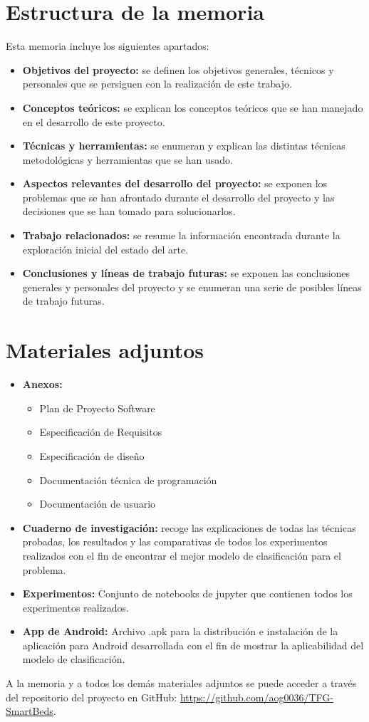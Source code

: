 \section{Estructura de la memoria}

Esta memoria incluye los siguientes apartados: 

\begin{itemize}
	\item \textbf{Objetivos del proyecto:} se definen los objetivos generales, técnicos y personales que se persiguen con la realización de este trabajo. 
	\item \textbf{Conceptos teóricos:} se explican los conceptos teóricos que se han manejado en el desarrollo de este proyecto. 
	\item \textbf{Técnicas y herramientas:} se enumeran y explican las distintas técnicas metodológicas y herramientas que se han usado. 
	\item \textbf{Aspectos relevantes del desarrollo del proyecto:} se exponen los problemas que se han afrontado durante el desarrollo del proyecto y las decisiones que se han tomado para solucionarlos. 
	\item \textbf{Trabajo relacionados:} se resume la información encontrada durante la exploración inicial del estado del arte. 
	\item \textbf{Conclusiones y líneas de trabajo futuras:} se exponen las conclusiones generales y personales del proyecto y se enumeran una serie de posibles líneas de trabajo futuras. 
\end{itemize}

\section{Materiales adjuntos}

\begin{itemize}	
	\item \textbf{Anexos:}
	\begin{itemize}
		\item Plan de Proyecto Software 
		\item Especificación de Requisitos
		\item Especificación de diseño
		\item Documentación técnica de programación 
		\item Documentación de usuario 
	\end{itemize}
	\item \textbf{Cuaderno de investigación:} recoge las explicaciones de todas las técnicas probadas, los resultados y las comparativas de todos los experimentos realizados con el fin de encontrar el mejor modelo de clasificación para el problema. 
	\item \textbf{Experimentos:} Conjunto de notebooks de jupyter que contienen todos los experimentos realizados. 
	\item \textbf{App de Android:} Archivo .apk para la distribución e instalación de la aplicación para Android desarrollada con el fin de mostrar la aplicabilidad del modelo de clasificación. 
\end{itemize}

A la memoria y a todos los demás materiales adjuntos se puede acceder a través del repositorio del proyecto en GitHub: \url{https://github.com/aog0036/TFG-SmartBeds}. 


